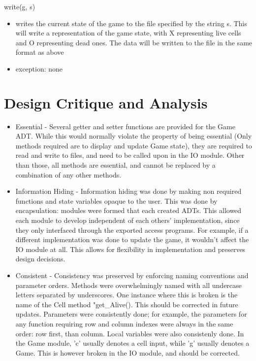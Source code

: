 \documentclass[]{article}
\begin{document}
write(g, s)
\begin{itemize}
\item writes the current state of the game to the file specified by the string s. This will write a representation of the game state, with X representing live cells and O representing dead ones. The data will be written to the file in the same format as above
\item exception: none
\end{itemize}

\newpage

\section*{Design Critique and Analysis}
\begin{itemize}
\item Essential - Several getter and setter functions are provided for the Game ADT. While this would normally violate the property of being essential (Only methods required are to display and update Game state), they are required to read and write to files, and need to be called upon in the IO module. Other than those, all methods are essential, and cannot be replaced by a combination of any other methods. 

\item Information Hiding - Information hiding was done by making non required functions and state variables opaque to the user. This was done by encapsulation: modules were formed that each created ADTs. This allowed each module to develop independent of each others' implementation, since they only interfaced through the exported access programs. For example, if a different implementation was done to update the game, it wouldn't affect the IO module at all. This allows for flexibility in implementation and preserves design decisions.

\item Consistent - Consistency was preserved by enforcing naming conventions and parameter orders. Methods were overwhelmingly named with all undercase letters separated by underscores. One instance where this is broken is the name of the Cell method "get\_Alive(). This should be corrected in future updates. Parameters were consistently done; for example, the parameters for any function requiring row and column indexes were always in the same order: row first, than column. Local variables were also consistenly done. In the Game module, 'c' usually denotes a cell input, while 'g' usually denotes a Game. This is however broken in the IO module, and should be corrected.


\end{itemize}
\end{document}
